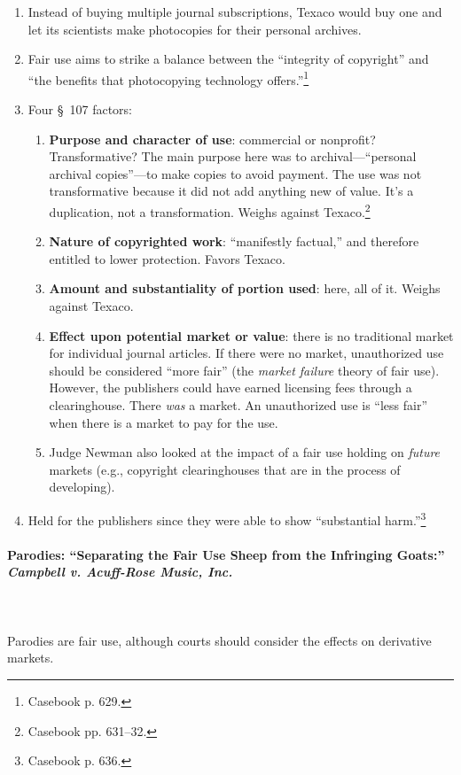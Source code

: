\begin{enumerate}
    \item Instead of buying multiple journal subscriptions, Texaco would buy 
    one and let its scientists make photocopies for their personal archives.
    \item Fair use aims to strike a balance between the ``integrity of 
    copyright'' and ``the benefits that photocopying technology 
    offers.''\footnote{Casebook p. 629.}
    \item Four \S\ 107 factors:
    \begin{enumerate}
        \item \textbf{Purpose and character of use}: commercial or nonprofit? 
        Transformative? The main purpose here was to archival---``personal 
        archival copies''---to make copies to avoid payment. The use was not 
        transformative because it did not add anything new of 
        value. It's a duplication, not a transformation. 
        Weighs against Texaco.\footnote{Casebook pp. 631--32.}
        \item \textbf{Nature of copyrighted work}: ``manifestly factual,'' and 
        therefore entitled to lower protection. Favors Texaco.
        \item \textbf{Amount and substantiality of portion used}: here, all of 
        it. Weighs against Texaco.
        \item \textbf{Effect upon potential market or value}: there is no 
        traditional market for individual journal articles. If there were no 
        market, unauthorized use should be considered ``more fair'' (the 
        \emph{market failure} theory of fair use). However, the publishers 
        could have earned licensing fees through a clearinghouse. There 
        \emph{was} a market. An unauthorized use is ``less fair'' when there 
        is a market to pay for the use.
        \item Judge Newman also looked at the impact of a fair use holding on 
        \emph{future} markets (e.g., copyright clearinghouses that are in the 
        process of developing).
    \end{enumerate}
    \item Held for the publishers since they were able to show ``substantial 
    harm.''\footnote{Casebook p. 636.}
\end{enumerate}

\paragraph{Parodies: ``Separating the Fair Use Sheep from the Infringing Goats:'' 
\emph{Campbell v. Acuff-Rose Music, Inc.}}
~\\\\
Parodies are fair use, although courts should consider the effects on 
derivative markets.

